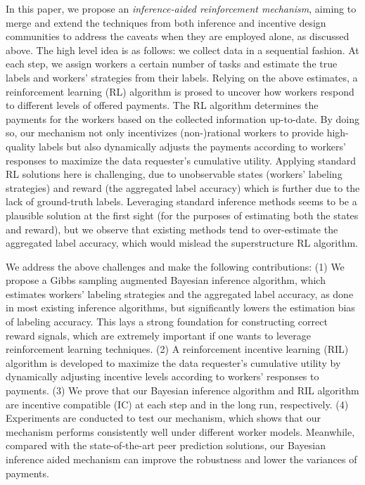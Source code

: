 \documentclass{article}
\begin{document}
In this paper, we propose an \emph{inference-aided reinforcement mechanism}, aiming to merge and extend the techniques from both inference and incentive design communities to address the caveats when they are employed alone, as discussed above.
The high level idea is as follows: we collect data in a sequential fashion. At each step, we assign workers a certain number of tasks and estimate the true labels and workers' strategies from their labels. Relying on the above estimates, a reinforcement learning (RL) algorithm is prosed to uncover how workers respond to different levels of offered payments.
The RL algorithm determines the payments for the workers based on the collected information up-to-date.
By doing so, our mechanism not only incentivizes (non-)rational workers to provide high-quality labels but also dynamically adjusts the payments according to workers' responses to maximize the data requester's cumulative utility. 
Applying standard RL solutions here is challenging, due to unobservable states (workers' labeling strategies) and reward (the aggregated label accuracy) which is further due to the lack of ground-truth labels. Leveraging standard inference methods seems to be a plausible solution at the first sight (for the purposes of estimating both the states and reward), but we observe that existing methods tend to over-estimate the aggregated label accuracy, which would mislead the superstructure RL algorithm.


We address the above challenges and make the following contributions: (1) We propose a Gibbs sampling augmented Bayesian inference algorithm, which estimates workers' labeling strategies and the aggregated label accuracy, as done in most existing inference algorithms, but significantly lowers the estimation bias of labeling accuracy. This lays a strong foundation for constructing correct reward signals, which are extremely important if one wants to leverage reinforcement learning techniques.
(2) A reinforcement incentive learning (RIL) algorithm is developed to maximize the data requester's cumulative utility by dynamically adjusting incentive levels according to workers' responses to payments. (3) We prove that our Bayesian inference algorithm and RIL algorithm are incentive compatible (IC) at each step and in the long run, respectively. (4) Experiments are conducted to test our mechanism, which shows that our mechanism performs consistently well under different worker models.
Meanwhile, compared with the state-of-the-art peer prediction solutions, our Bayesian inference aided mechanism can improve the robustness and lower the variances of payments.
\end{document}
